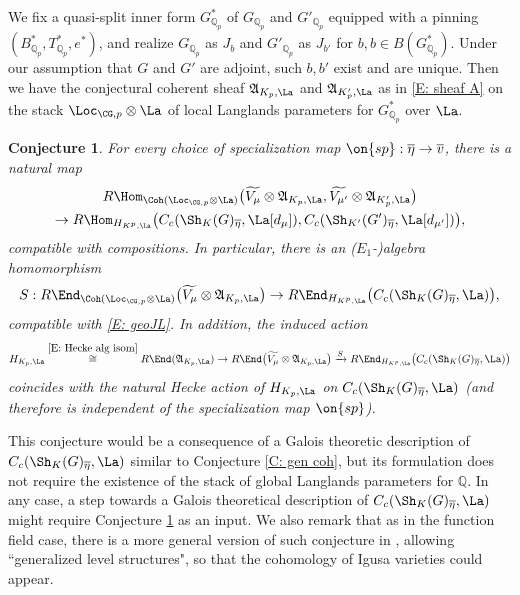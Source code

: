 \documentclass[11pt]{amsart}
\newtheorem{conjecture}[thm]{Conjecture}
\theoremstyle{definition}
\theoremstyle{definition}
\theoremstyle{definition}
\numberwithin{equation}{section}
\newcommand{\frakA}{{\mathfrak A}}
\newcommand{\bQ}{{\mathbb Q}}
\begin{document}
We fix a quasi-split inner form $G^*_{\bQ_p}$ of $G_{\bQ_p}$ and $G'_{\bQ_p}$ equipped with a pinning $(B^*_{\bQ_p},T^*_{\bQ_p},e^*)$, and realize $G_{\bQ_p}$ as $J_b$ and $G'_{\bQ_p}$ as $J_{b'}$ for $b,b\in B(G^*_{\bQ_p})$. Under our assumption that $G$ and $G'$ are adjoint, such $b,b'$ exist and are unique. Then we have the conjectural coherent sheaf $\frakA_{K_p,\La}$ and $\frakA_{K'_p,\La}$ as in \eqref{E: sheaf A} on the stack $\Loc_{\CG,p}\otimes\La$ of local Langlands parameters for $G^*_{\bQ_p}$ over $\La$. 

\begin{conjecture}\label{C: geo JL}
For every choice of specialization map $\on{sp}: \overline{\eta}\to \overline{v}$, there is a natural map
\begin{multline}\label{E: geoJL}
R\Hom_{\Coh(\Loc_{\CG,p}\otimes\La)}\bigl(\widetilde{V_\mu}\otimes \frakA_{K_p,\La}, \widetilde{V_{\mu'}}\otimes \frakA_{K'_p,\La}\bigr)\\
\to R\Hom_{H_{K^p,\La}}\bigl(C_c(\Sh_{K}(G)_{\overline\eta}, \La[d_{\mu}]), C_c(\Sh_{K'}(G')_{\overline\eta},\La[d_{\mu'}])\bigr),
\end{multline}
compatible with compositions.  
In particular, there is an ($E_1$-)algebra homomorphism
\begin{equation}\label{E: S operator}
S:R\End_{\Coh(\Loc_{\CG,p}\otimes\La)}\bigl( \widetilde{V_\mu}\otimes \frakA_{K_p,\La}\bigr)\to R\End_{H_{K^p,\La}}\bigl(C_c(\Sh_{K}(G)_{\overline\eta},\La)\bigr),
\end{equation}
compatible with \eqref{E: geoJL}. In addition, the induced action
\begin{equation}\label{E: S action}
H_{K_p,\La}\stackrel{\eqref{E: Hecke alg isom}}{\cong} R\End(\frakA_{K_p,\La})\to R\End\bigl(\widetilde{V_\mu}\otimes \frakA_{K_p,\La}\bigr)\xrightarrow{S} R\End_{H_{K^p,\La}}\bigl(C_c(\Sh_{K}(G)_{\overline\eta},\La)\bigr)
\end{equation}
coincides with the natural Hecke action of $H_{K_p,\La}$ on $C_c(\Sh_{K}(G)_{\overline\eta},\La)$ (and therefore is independent of the specialization map $\on{sp}$).
\end{conjecture}
This conjecture would be a consequence of a Galois theoretic description of $C_c(\Sh_{K}(G)_{\overline\eta},\La)$ similar to Conjecture \ref{C: gen coh}, but its formulation does not require the existence of the stack of global Langlands parameters for $\bQ$. In any case, a step towards a Galois theoretical description of  $C_c(\Sh_{K}(G)_{\overline\eta},\La)$ might require Conjecture \ref{C: geo JL} as an input. We also remark that
as in the function field case, there is a more general version of such conjecture in \cite[Sect. 4.7]{Zhu-Conjecture}, allowing ``generalized level structures", so that the cohomology of Igusa varieties could appear.
\end{document}
